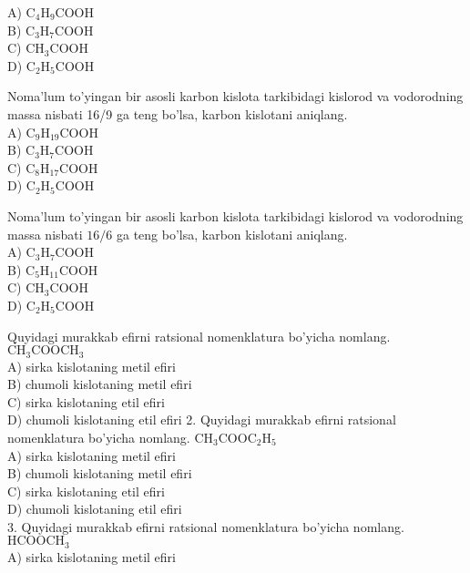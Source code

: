 A) $\mathrm{C}_{4} \mathrm{H}_{9} \mathrm{COOH}$\\
B) $\mathrm{C}_{3} \mathrm{H}_{7} \mathrm{COOH}$\\
C) $\mathrm{CH}_{3} \mathrm{COOH}$\\
D) $\mathrm{C}_{2} \mathrm{H}_{5} \mathrm{COOH}$
  \item Noma'lum to'yingan bir asosli karbon kislota tarkibidagi kislorod va vodorodning massa nisbati 16/9 ga teng bo'lsa, karbon kislotani aniqlang.\\
A) $\mathrm{C}_{9} \mathrm{H}_{19} \mathrm{COOH}$\\
B) $\mathrm{C}_{3} \mathrm{H}_{7} \mathrm{COOH}$\\
C) $\mathrm{C}_{8} \mathrm{H}_{17} \mathrm{COOH}$\\
D) $\mathrm{C}_{2} \mathrm{H}_{5} \mathrm{COOH}$
  \item Noma'lum to'yingan bir asosli karbon kislota tarkibidagi kislorod va vodorodning massa nisbati $16 / 6$ ga teng bo'lsa, karbon kislotani aniqlang.\\
A) $\mathrm{C}_{3} \mathrm{H}_{7} \mathrm{COOH}$\\
B) $\mathrm{C}_{5} \mathrm{H}_{11} \mathrm{COOH}$\\
C) $\mathrm{CH}_{3} \mathrm{COOH}$\\
D) $\mathrm{C}_{2} \mathrm{H}_{5} \mathrm{COOH}$
  \item Quyidagi murakkab efirni ratsional nomenklatura bo'yicha nomlang.\\
$\mathrm{CH}_{3} \mathrm{COOCH}_{3}$\\
A) sirka kislotaning metil efiri\\
B) chumoli kislotaning metil efiri\\
C) sirka kislotaning etil efiri\\
D) chumoli kislotaning etil efiri
2. Quyidagi murakkab efirni ratsional nomenklatura bo'yicha nomlang. $\mathrm{CH}_{3} \mathrm{COOC}_{2} \mathrm{H}_{5}$\\
A) sirka kislotaning metil efiri\\
B) chumoli kislotaning metil efiri\\
C) sirka kislotaning etil efiri\\
D) chumoli kislotaning etil efiri\\
3. Quyidagi murakkab efirni ratsional nomenklatura bo'yicha nomlang.\\
$\mathrm{HCOOCH}_{3}$\\
A) sirka kislotaning metil efiri\\
